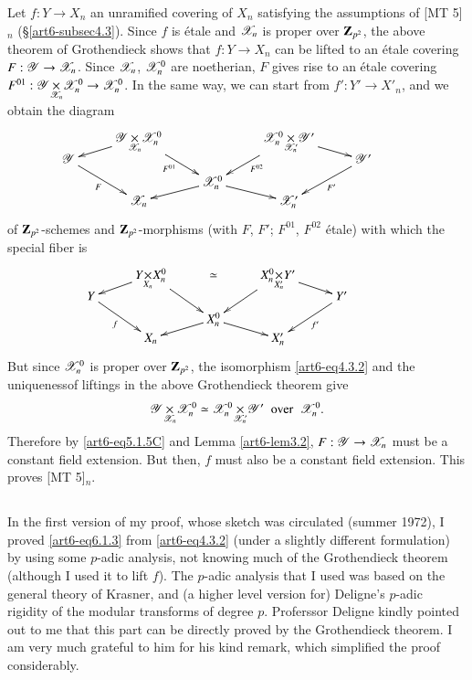Let $f : Y \to X_n$ an unramified covering of $X_n$ satisfying the assumptions of [MT 5]$_n$ (\S \ref{art6-subsec4.3}). Since $f$ is \'etale and $\mathscr{X}_n$ is proper over $\mathbf{Z}_{p^2}$, the above theorem of Grothendieck shows that $f: Y \to X_n$ can be lifted to an \'etale covering $F : \mathscr{Y} \to \mathscr{X}_n$. Since $\mathscr{X}_n$, $\mathscr{X}^0_n$ are noetherian, $F$ gives rise to an \'etale covering $F^{01} : \fprod{\sY}{\sX^0_n}{\sX_n} \to \sX^0_n$. In the same way, we can start from $f': Y' \to X'_n$, and we obtain the diagram
\setcounter{equation}{0}
\begin{equation}
\vcenter{
\xymatrix@R=-0.05cm@C=0.9cm{
& \fprod{\sY}{\sX^0_n}{\sX_n} \ar[dddr]_{F^{01}} \ar[dl]  &  & \fprod{\sX^0_n}{\sY'}{\sX'_n} \ar[dr] \ar[dddl]^{F^{02}} & \\
\sY \ar[dddr]_-F & & & & \sY'\ar[dddl]^-{F'}\\
& & & & & \\
& & \sX^0_n \ar[dr] \ar[dl] & & \\
& \sX_n & & \sX'_n &
}}\label{art6-eq6.1.1}
\end{equation}
of $\mathbf{Z}_{p^2}$-schemes and $\mathbf{Z}_{p^2}$-morphisms (with $F$, $F'$; $F^{01}$, $F^{02}$ \'etale) with which the special fiber is 
\begin{equation}
\vcenter{
\xymatrix@R=-0.05cm@C=0.9cm{
& \fprod{Y}{X^0_n}{X_n} \ar[dddr] \ar[dl]  & \simeq  & \fprod{X^0_n}{Y'}{X'_n} \ar[dr] \ar[dddl] & \\
Y \ar[dddr]_-f & & & & Y'\ar[dddl]^-{f'}\\
& & & & & \\
& & X^0_n \ar[dr] \ar[dl] & & \\
& X_n & & X'_n &
}}\label{art6-eq6.1.2}
\end{equation}
But since $\mathscr{X}^0_n$ is proper over $\mathbf{Z}_{p^2}$, the isomorphism  \eqref{art6-eq4.3.2} and the uniqueness\pageoriginale of liftings in the above Grothendieck theorem give
\begin{equation}
\fprod{\sY}{\sX^0_n}{\sX_n} \simeq \fprod{\sX^0_n}{\sY'}{\sX'_n} \text{\; over \;} \sX^0_n. \label{art6-eq6.1.3} 
\end{equation}
Therefore by \eqref{art6-eq5.1.5C} and Lemma \ref{art6-lem3.2}, $F: \mathscr{Y} \to \mathscr{X}_n$ must be a constant field extension. But then, $f$ must also be a constant field extension. This proves [MT 5]$_n$.

\subsection{}\label{art6-subsec6.2}
In the first version of my proof, whose sketch was circulated (summer 1972), I proved \eqref{art6-eq6.1.3} from \eqref{art6-eq4.3.2} (under a slightly different formulation) by using some $p$-adic analysis, not knowing much of the Grothendieck theorem (although I used it to lift $f$). The $p$-adic analysis that I used was based on the general theory of Krasner, and (a higher level version for) Deligne's $p$-adic rigidity of the modular transforms of degree $p$. Proferssor Deligne kindly pointed out to me that this part can be directly proved by the Grothendieck theorem. I am very much grateful to him for his kind remark, which simplified the proof considerably.
 

